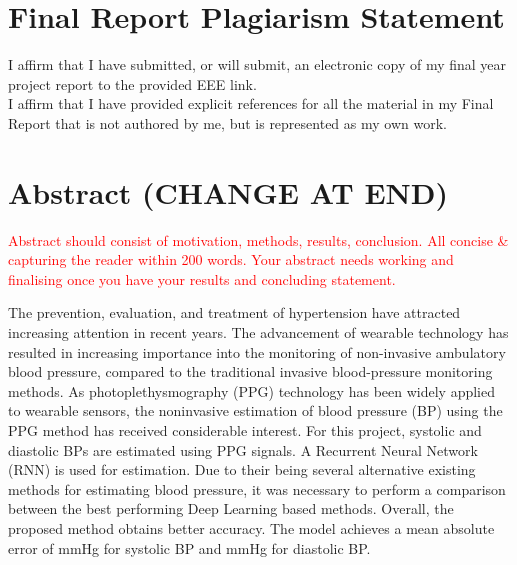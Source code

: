 \section*{Final Report Plagiarism Statement}
I affirm that I have submitted, or will submit, an electronic copy of 
my final year project report to the provided EEE link.\\ \newline \noindent I affirm 
that I have provided explicit references for all the material in my Final Report that 
is not authored by me, but is represented as my own work.

\newpage


\section*{Abstract (CHANGE AT END)}

\textcolor{red}{Abstract should consist of motivation, methods, results, conclusion.
All concise \& capturing the reader within 200 words. Your abstract needs working and finalising once you have your results and concluding statement. }


The prevention,  evaluation,  and  treatment  of  hypertension  
have  attracted  increasing  attention  in  recent  years. The advancement of wearable technology has resulted in increasing importance 
into the monitoring of non-invasive ambulatory blood pressure, compared to the traditional 
invasive blood-pressure monitoring methods. As photoplethysmography (PPG) technology has been widely 
applied to wearable sensors, the noninvasive estimation of blood
pressure (BP) using the PPG method has received considerable interest. For this project, systolic and diastolic BPs are estimated using PPG signals. A Recurrent Neural Network (RNN) is 
used for estimation. Due to their being several alternative existing methods for 
estimating blood pressure, it was necessary to perform a comparison between 
the best performing Deep Learning based methods. Overall, the proposed 
method obtains better accuracy. The model achieves a mean absolute error of  mmHg 
for systolic BP and  mmHg for diastolic BP.